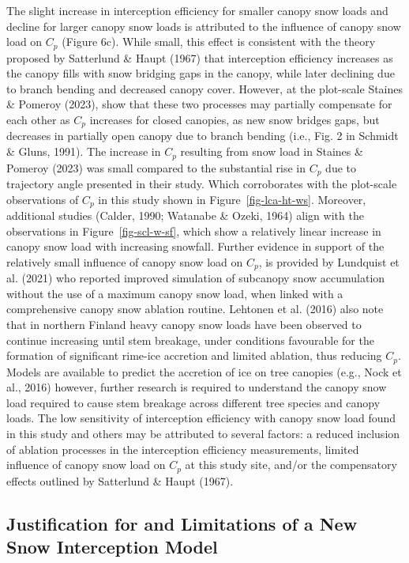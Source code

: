 \documentclass[
  letterpaper,
  DIV=11,
  numbers=noendperiod]{scrartcl}
\begin{document}
The slight increase in interception efficiency for smaller canopy snow
loads and decline for larger canopy snow loads is attributed to the
influence of canopy snow load on \(C_p\) (Figure 6c). While small, this
effect is consistent with the theory proposed by Satterlund \& Haupt
(1967) that interception efficiency increases as the canopy fills with
snow bridging gaps in the canopy, while later declining due to branch
bending and decreased canopy cover. However, at the plot-scale Staines
\& Pomeroy (2023), show that these two processes may partially
compensate for each other as \(C_p\) increases for closed canopies, as
new snow bridges gaps, but decreases in partially open canopy due to
branch bending (i.e., Fig. 2 in Schmidt \& Gluns, 1991). The increase in
\(C_p\) resulting from snow load in Staines \& Pomeroy (2023) was small
compared to the substantial rise in \(C_p\) due to trajectory angle
presented in their study. Which corroborates with the plot-scale
observations of \(C_p\) in this study shown in
Figure~\ref{fig-lca-ht-ws}. Moreover, additional studies (Calder, 1990;
Watanabe \& Ozeki, 1964) align with the observations in
Figure~\ref{fig-scl-w-sf}, which show a relatively linear increase in
canopy snow load with increasing snowfall. Further evidence in support
of the relatively small influence of canopy snow load on \(C_p\), is
provided by Lundquist et al. (2021) who reported improved simulation of
subcanopy snow accumulation without the use of a maximum canopy snow
load, when linked with a comprehensive canopy snow ablation routine.
Lehtonen et al. (2016) also note that in northern Finland heavy canopy
snow loads have been observed to continue increasing until stem
breakage, under conditions favourable for the formation of significant
rime-ice accretion and limited ablation, thus reducing \(C_p\). Models
are available to predict the accretion of ice on tree canopies (e.g.,
Nock et al., 2016) however, further research is required to understand
the canopy snow load required to cause stem breakage across different
tree species and canopy loads. The low sensitivity of interception
efficiency with canopy snow load found in this study and others may be
attributed to several factors: a reduced inclusion of ablation processes
in the interception efficiency measurements, limited influence of canopy
snow load on \(C_p\) at this study site, and/or the compensatory effects
outlined by Satterlund \& Haupt (1967).

\subsection{Justification for and Limitations of a New Snow Interception
Model}\label{justification-for-and-limitations-of-a-new-snow-interception-model}
\end{document}
